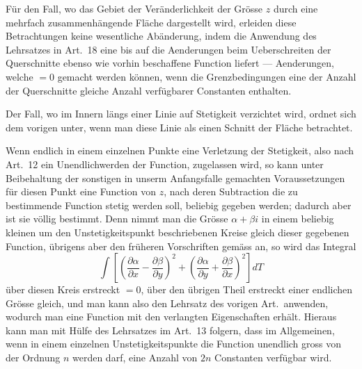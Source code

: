 \documentclass[12pt,a4paper]{book}
\theoremstyle{definition}
\theoremstyle{remark}
\begin{document}
Für den Fall, wo das Gebiet der Veränderlichkeit der Grösse $z$ durch eine mehrfach zusammenhängende Fläche dargestellt wird, erleiden diese Betrachtungen keine wesentliche Abänderung, indem die Anwendung des Lehrsatzes in Art.~18 eine bis auf die Aenderungen beim Ueberschreiten der Querschnitte ebenso wie vorhin beschaffene Function liefert --- Aenderungen, welche ${}= 0$ gemacht werden können, wenn die Grenzbedingungen eine der Anzahl der Querschnitte gleiche Anzahl verfügbarer Constanten enthalten.

Der Fall, wo im Innern längs einer Linie auf Stetigkeit verzichtet wird, ordnet sich dem vorigen unter, wenn man diese Linie als einen Schnitt der Fläche betrachtet.

Wenn endlich in einem einzelnen Punkte eine Verletzung der Stetigkeit, also nach Art.~12 ein Unendlichwerden der Function, zugelassen wird, so kann unter Beibehaltung der sonstigen in unserm Anfangsfalle gemachten Voraussetzungen für diesen Punkt eine Function von $z$, nach deren Subtraction die zu bestimmende Function stetig werden soll, beliebig gegeben werden; dadurch aber ist sie völlig bestimmt. Denn nimmt man die Grösse $\alpha + \beta i$ in einem beliebig kleinen um den Unstetigkeitspunkt beschriebenen Kreise gleich dieser gegebenen Function, übrigens aber den früheren Vorschriften gemäss an, so wird das Integral
\[
\int \left[\left(\frac{\partial \alpha}{\partial x} - \frac{\partial \beta}{\partial y}\right)^2 + \left(\frac{\partial \alpha}{\partial y} + \frac{\partial \beta}{\partial x}\right)^2\right] dT
\]
über diesen Kreis erstreckt ${}= 0$, über den übrigen Theil erstreckt einer endlichen Grösse gleich, und man kann also den Lehrsatz des vorigen Art.\ anwenden, wodurch man eine Function mit den verlangten Eigenschaften erhält. Hieraus kann man mit Hülfe des Lehrsatzes im Art.~13 folgern, dass im Allgemeinen, wenn in einem einzelnen Unstetigkeitspunkte die Function unendlich gross von der Ordnung $n$ werden darf, eine Anzahl von $2n$ Constanten verfügbar wird.
\end{document}

